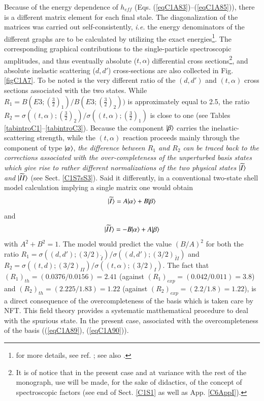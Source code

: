 Because of the energy dependence of $h_{eff}$ (Eqs. (\ref{eqC1A83})--(\ref{eqC1A85})), there is a different matrix element 
for each final stale. The diagonalization of the matrices was carried out self-consistently, \textit{i.e.} the energy denominators of the different graphs are to be calculated by utilizing the exact energies\footnote{for more details, see ref. \cite{Bortignon:77}; see also \cite{Bortignon:76}.}. 
The corresponding graphical contributions to the single-particle spectroscopic amplitudes, and thus eventually absolute ($t,\alpha$) differential cross sections\footnote{It is of notice that in the present case and at variance with the rest of the monograph, use will be made, for the sake of  didactics, of the concept of spectroscopic factors (see end of Sect. \ref{C1S1} as well as App. \ref{C6AppI}).}, and absolute inelastic scattering ($d,d'$) cross-sections are also collected in Fig. \ref{figC1A7}. To be noted is the very different ratio of the $(d,d')$ and $(t,\alpha)$ cross sections associated with the two states. While $R_1=B(E3;(\frac{3}{2})_1)/B(E3;(\frac{3}{2})_2))$ is approximately equal to 2.5, the ratio $R_2=\sigma((t,\alpha);(\frac{3}{2})_2)/\sigma((t,\alpha);(\frac{3}{2})_1)$ is close to one (see Tables \ref{tabintroC1}--\ref{tabintroC3}). Because the component $|{\beta} \rangle$ carries the inelastic-scattering strength, while the $(t,\alpha)$ reaction proceeds mainly through the component of type $|{\alpha} \rangle$, \textit{the difference between $R_1$ and $R_2$ can be traced back to the corrections associated with the over-completeness of the unperturbed basis states which give rise to rather different normalizations of the two physical states $|{\widetilde I} \rangle$ and $|{\widetilde {II}} \rangle$} (see Sect.   \ref{C1S7sS3}). Said it differently, in a conventional two-state shell model calculation implying a single matrix one would obtain
  \begin{align}\label{eq2.6.94} 
|{\widetilde I} \rangle=A|{\alpha} \rangle+B|{\beta} \rangle
\end{align} 
and
  \begin{align}\label{eq2.6.95} 
|{\widetilde {II}} \rangle=-B|{\alpha} \rangle+A|{\beta} \rangle
\end{align} 
with $A^2+B^2=1$. The model would predict the value $(B/A)^2$ for both the ratio $R_1=\sigma((d,d');(3/2)_{\widetilde I})/\sigma((d,d');(3/2)_{\widetilde {II}})$ and $R_2=\sigma((t,d);(3/2)_{II})/\sigma((t,\alpha);(3/2)_{I})$. The fact that $(R_1)_{th}=(0.0376/0.0156)=2.41$ (against $(R_1)_{exp}=(0.042/0.011)=3.8$) and $(R_2)_{th}=(2.225/1.83)=1.22$ (against $(R_2)_{exp}=(2.2/1.8)=1.22$), is a direct consequence of the overcompleteness of the basis which is taken care by NFT. This field theory provides a systematic matthematical procedure to deal with the spurious state. In the present case, associated with the overcompleteness of the basis ((\ref{eqC1A89}), (\ref{eqC1A90})).

